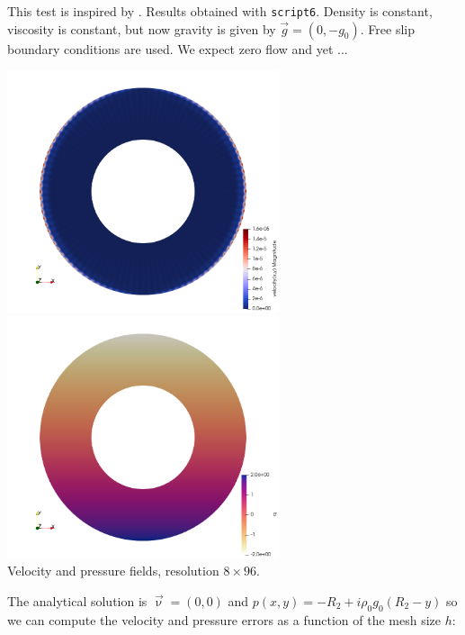 This test is inspired by \textcite{behr04}. Results obtained with {\tt script6}.
Density is constant, viscosity is constant, but now gravity is given by $\vec{g}=(0,-g_0)$.
Free slip boundary conditions are used. We expect zero flow and yet ...


\begin{center}
\includegraphics[width=8cm]{python_codes/fieldstone_151/results/test6/vel}
\includegraphics[width=8cm]{python_codes/fieldstone_151/results/test6/press}\\
{\captionfont Velocity and pressure fields, resolution $8\times 96$.}
\end{center}

The analytical solution is $\vec\upnu=(0,0)$ and $p(x,y)=-R_2+i\rho_0 g_0(R_2-y)$ so 
we can compute the velocity and pressure errors as a function of the mesh size $h$:

